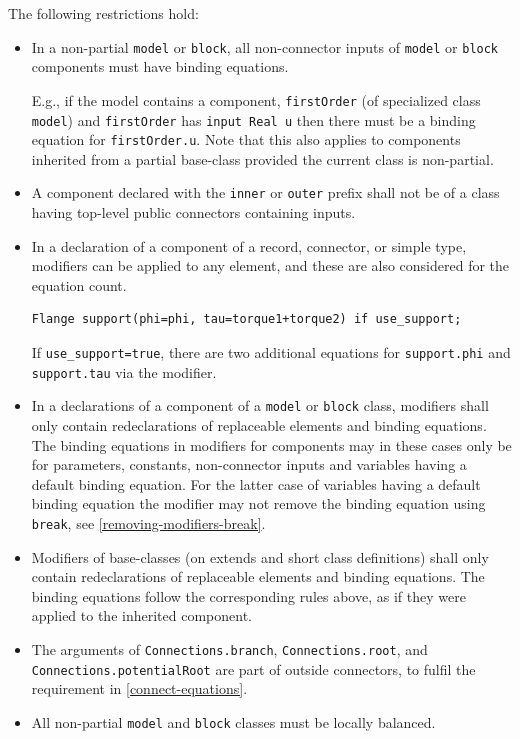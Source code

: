 The following restrictions hold:
\begin{itemize}
\item
  In a non-partial \lstinline!model! or \lstinline!block!, all non-connector inputs of \lstinline!model! or \lstinline!block! components must have binding equations.
  \begin{nonnormative}
  E.g., if the model contains a component, \lstinline!firstOrder! (of specialized class \lstinline!model!) and \lstinline!firstOrder! has
  \lstinline!input Real u! then there must be a binding equation for \lstinline!firstOrder.u!.
  Note that this also applies to components inherited from a partial base-class provided the current class is non-partial.
  \end{nonnormative}
\item
  A component declared with the \lstinline!inner! or \lstinline!outer! prefix shall not be of a class having top-level public connectors containing inputs.
\item
  In a declaration of a component of a record, connector, or simple type, modifiers can be applied to any element, and these are also considered for the equation count.
\begin{example}
\begin{lstlisting}[language=modelica]
Flange support(phi=phi, tau=torque1+torque2) if use_support;
\end{lstlisting}
  If \lstinline!use_support=true!, there are two additional equations for \lstinline!support.phi! and \lstinline!support.tau! via the modifier.
\end{example}
\item
  In a declarations of a component of a \lstinline!model! or \lstinline!block! class, modifiers shall only contain redeclarations of replaceable elements and binding equations.
  The binding equations in modifiers for components may in these cases only be for parameters, constants, non-connector inputs and variables having a default binding equation.
  For the latter case of variables having a default binding equation the modifier may not remove the binding equation using \lstinline!break!, see \cref{removing-modifiers-break}.
\item
  Modifiers of base-classes (on extends and short class definitions) shall only contain redeclarations of replaceable elements and binding equations.
  The binding equations follow the corresponding rules above, as if they were applied to the inherited component.
\item
  The arguments of \lstinline!Connections.branch!, \lstinline!Connections.root!, and \lstinline!Connections.potentialRoot! are part of outside connectors, to fulfil the requirement in \cref{connect-equations}.
\item
  All non-partial \lstinline!model! and \lstinline!block! classes must be locally balanced.
\end{itemize}

